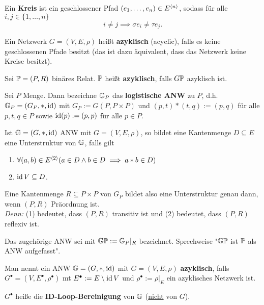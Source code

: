 \begin{definition}
    Ein \textbf{Kreis} ist ein geschlossener Pfad $(e_1,\ldots,e_n) \in E^{\<n\>}$, sodass für alle $i,j \in \{1,\ldots,n\}$ 
    $$ i \neq j \implies \sigma e_i \ne \tau e_j .$$
\end{definition}

\begin{definition}
    Ein Netzwerk $G=(V,E,\rho)$ heißt \textbf{azyklisch} (acyclic), falls es keine geschlossenen Pfade besitzt (das ist dazu
    äquivalent, dass das Netzwerk keine Kreise besitzt).
\end{definition}

\begin{definition}
    Sei $\P = (P,R)$ binäres Relat. $\P$ heißt \textbf{azyklisch}, falls $G\P$ azyklisch ist.
\end{definition}

\begin{erinnerungnr}
    Sei $P$ Menge. Dann bezeichne $\G_P$ das \textbf{logistische ANW} zu $P$, d.h. $\G_P=(G_P, \ast, \id)$
    mit $G_P := G(P, P \times P)$ und $(p,t)\ast(t,q) := (p,q)$ für alle $p,t,q \in P$ sowie 
    $\id(p) := (p,p)$ für alle $p \in P$.

    Ist $\G=(G,\ast, \id)$ ANW mit $G=(V,E,\rho)$, so bildet eine Kantenmenge $D \subseteq E$ eine Unterstruktur
    von $\G$, falls gilt
    \begin{enumerate}[label=(\arabic*)]
        \item $\forall (a,b) \in E^{\<2\>}(a\in D \land b \in D \implies a \ast b \in D)$
        \item $\id V \subseteq D$.
    \end{enumerate}

    Eine Kantenmenge $R \subseteq P \times P$ von $G_P$ bildet also eine Unterstruktur genau dann, wenn
    $(P,R)$ Präordnung ist.\\
    \textit{Denn:} (1) bedeutet, dass $(P,R)$ transitiv ist und (2) bedeutet, dass $(P,R)$ reflexiv ist.

    Das zugehörige ANW sei mit $\G\P := \G_P|_R$ bezeichnet. Sprechweise "$\G\P$ ist $\P$ als ANW aufgefasst".
\end{erinnerungnr}

\begin{definition}
    Man nennt ein ANW $\G = (G, \ast, \id)$ mit $G=(V,E,\rho)$ \textbf{azyklisch}, falls 
    $G^\bullet =(V,E^\bullet, \rho^\bullet)$ mt $E^\bullet := E \setminus \id V$ und $\rho^\bullet := \rho|_E$
    ein azyklisches Netzwerk ist.

    $G^\bullet$ heiße die \textbf{ID-Loop-Bereinigung} von $\G$ (\underline{nicht} von $G$).
\end{definition}


